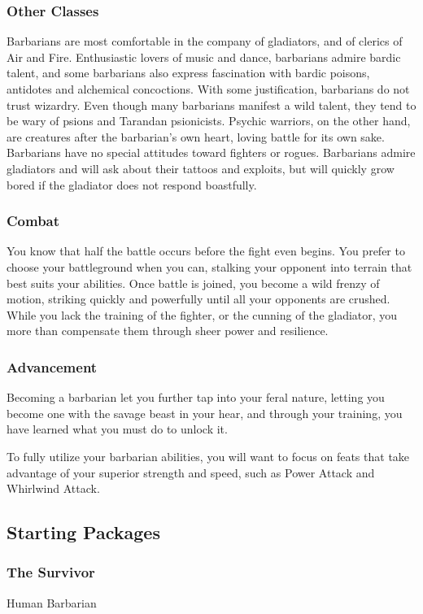 \subsubsection{Other Classes}
Barbarians are most comfortable in the company of gladiators, and of clerics of Air and Fire. Enthusiastic lovers of music and dance, barbarians admire bardic talent, and some barbarians also express fascination with bardic poisons, antidotes and alchemical concoctions. With some justification, barbarians do not trust wizardry. Even though many barbarians manifest a wild talent, they tend to be wary of psions and Tarandan psionicists. Psychic warriors, on the other hand, are creatures after the barbarian's own heart, loving battle for its own sake. Barbarians have no special attitudes toward fighters or rogues. Barbarians admire gladiators and will ask about their tattoos and exploits, but will quickly grow bored if the gladiator does not respond boastfully.

\subsubsection{Combat}
You know that half the battle occurs before the fight even begins. You prefer to choose your battleground when you can, stalking your opponent into terrain that best suits your abilities. Once battle is joined, you become a wild frenzy of motion, striking quickly and powerfully until all your opponents are crushed. While you lack the training of the fighter, or the cunning of the gladiator, you more than compensate them through sheer power and resilience.

\subsubsection{Advancement}
Becoming a barbarian let you further tap into your feral nature, letting you become one with the savage beast in your hear, and through your training, you have learned what you must do to unlock it.

To fully utilize your barbarian abilities, you will want to focus on feats that take advantage of your superior strength and speed, such as Power Attack and Whirlwind Attack.


\subsection{Starting Packages}
\subsubsection{The Survivor}
Human Barbarian

